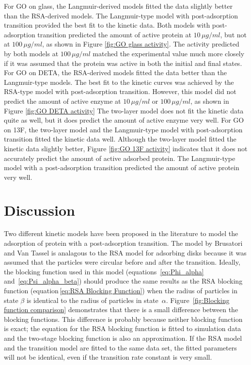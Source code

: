 For GO on glass, the Langmuir-derived models fitted the data slightly
better than the RSA-derived models. The Langmuir-type model with post-adsorption
transition provided the best fit to the kinetic data. Both models
with post-adsorption transition predicted the amount of active protein
at $10\,\mu g/ml$, but not at $100\,\mu g/ml$, as shown in Figure
\ref{fig:GO glass activity}. The activity predicted by both models
at $100\,\mu g/ml$ matched the experimental value much more closely
if it was assumed that the protein was active in both the initial
and final states. For GO on DETA, the RSA-derived models fitted the
data better than the Langmuir-type models. The best fit to the kinetic
curves was achieved by the RSA-type model with post-adsorption transition.
However, this model did not predict the amount of active enzyme at
$10\,\mu g/ml$ or $100\,\mu g/ml$, as shown in Figure \ref{fig:GO DETA activity}
The two-layer model does not fit the kinetic data quite as well, but
it does predict the amount of active enzyme very well. For GO on 13F,
the two-layer model and the Langmuir-type model with post-adsorption
transition fitted the kinetic data well. Although the two-layer model
fitted the kinetic data slightly better, Figure \ref{fig:GO 13F activity}
indicates that it does not accurately predict the amount of active
adsorbed protein. The Langmuir-type model with a post-adsorption transition
predicted the amount of active protein very well.


\section{Discussion}

Two different kinetic models have been proposed in the literature
to model the adsorption of protein with a post-adsorption transition.
The model by Brusatori and Van Tassel \cite{Brusatori1999} is analagous
to the RSA model for adsorbing disks because it was assumed that the
particles were circular before and after the transition. Ideally,
the blocking function used in this model (equations~\ref{eq:Phi_alpha}
and~\ref{eq:Psi_alpha_beta}) should produce the same results as
the RSA blocking function (equation\,\ref{eq:RSA Blocking Function})
when the radius of particles in state $\beta$ is identical to the
radius of particles in state~$\alpha$. Figure~\ref{fig:Blocking function comparison}
demonstrates that there is a small difference between the blocking
functions. This difference is probably because neither blocking function
is exact; the equation for the RSA blocking function is fitted to
simulation data and the two-stage blocking function is also an approximation.
If the RSA model and the transition model are fitted to the same data
set, the fitted parameters will not be identical, even if the transition
rate constant is very small.

